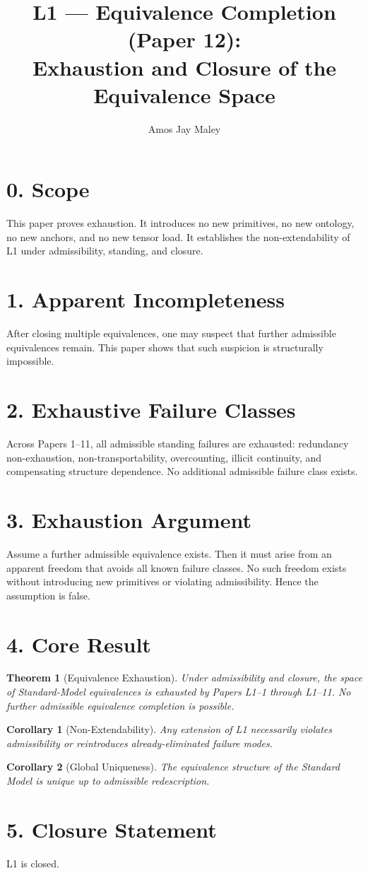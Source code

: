 ﻿\documentclass[11pt]{article}
\title{L1 --- Equivalence Completion (Paper 12):\\
Exhaustion and Closure of the Equivalence Space}
\author{Amos Jay Maley}
\date{}
\newtheorem{theorem}{Theorem}
\newtheorem{corollary}{Corollary}
\begin{document}
\maketitle

\section*{0. Scope}
This paper proves exhaustion. It introduces no new primitives, no new ontology, no new anchors, and no new tensor load.
It establishes the non-extendability of L1 under admissibility, standing, and closure.

\section*{1. Apparent Incompleteness}
After closing multiple equivalences, one may suspect that further admissible equivalences remain.
This paper shows that such suspicion is structurally impossible.

\section*{2. Exhaustive Failure Classes}
Across Papers 1--11, all admissible standing failures are exhausted:
redundancy non-exhaustion, non-transportability, overcounting, illicit continuity, and compensating structure dependence.
No additional admissible failure class exists.

\section*{3. Exhaustion Argument}
Assume a further admissible equivalence exists.
Then it must arise from an apparent freedom that avoids all known failure classes.
No such freedom exists without introducing new primitives or violating admissibility.
Hence the assumption is false.

\section*{4. Core Result}
\begin{theorem}[Equivalence Exhaustion]
Under admissibility and closure, the space of Standard-Model equivalences is exhausted by Papers L1--1 through L1--11.
No further admissible equivalence completion is possible.
\end{theorem}

\begin{corollary}[Non-Extendability]
Any extension of L1 necessarily violates admissibility or reintroduces already-eliminated failure modes.
\end{corollary}

\begin{corollary}[Global Uniqueness]
The equivalence structure of the Standard Model is unique up to admissible redescription.
\end{corollary}

\section*{5. Closure Statement}
L1 is closed.
\end{document}
